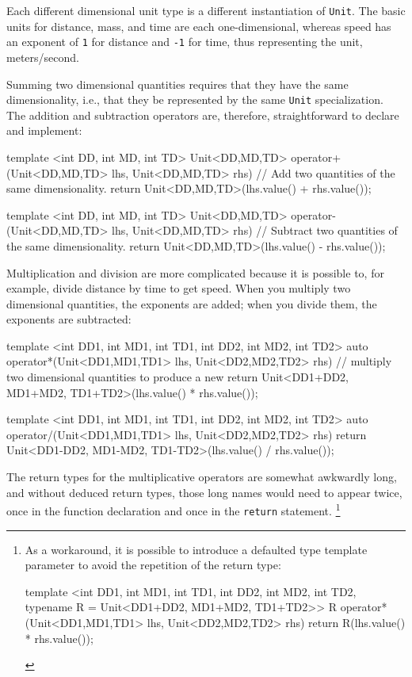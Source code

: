 \noindent Each different dimensional unit type is a different instantiation of
\lstinline!Unit!. The basic units for distance, mass, and time are each
one-dimensional, whereas speed has an exponent of \lstinline!1! for
distance and \lstinline!-1! for time, thus representing the unit,
meters/second.

Summing two dimensional quantities requires that they have the same
dimensionality, i.e., that they be represented by the same \lstinline!Unit!
specialization. The addition and subtraction operators are, therefore,
straightforward to declare and implement:

\begin{emcppslisting}[emcppsbatch=e5]
template <int DD, int MD, int TD>
Unit<DD,MD,TD> operator+(Unit<DD,MD,TD> lhs, Unit<DD,MD,TD> rhs)
    // Add two quantities of the same dimensionality.
{
    return Unit<DD,MD,TD>(lhs.value() + rhs.value());
}

template <int DD, int MD, int TD>
Unit<DD,MD,TD> operator-(Unit<DD,MD,TD> lhs, Unit<DD,MD,TD> rhs)
    // Subtract two quantities of the same dimensionality.
{
    return Unit<DD,MD,TD>(lhs.value() - rhs.value());
}
\end{emcppslisting}
    

\noindent Multiplication and division are more complicated because it is possible
to, for example, divide distance by time to get speed. When you multiply
two dimensional quantities, the exponents are added; when you divide
them, the exponents are subtracted:

\begin{emcppslisting}[emcppsbatch=e5]
template <int DD1, int MD1, int TD1, int DD2, int MD2, int TD2>
auto operator*(Unit<DD1,MD1,TD1> lhs, Unit<DD2,MD2,TD2> rhs)
    // multiply two dimensional quantities to produce a new
{
    return Unit<DD1+DD2, MD1+MD2, TD1+TD2>(lhs.value() * rhs.value());
}

template <int DD1, int MD1, int TD1, int DD2, int MD2, int TD2>
auto operator/(Unit<DD1,MD1,TD1> lhs, Unit<DD2,MD2,TD2> rhs)
{
    return Unit<DD1-DD2, MD1-MD2, TD1-TD2>(lhs.value() / rhs.value());
}
\end{emcppslisting}
    

\noindent The return types for the multiplicative operators are somewhat awkwardly
long, and without deduced return types, those long names would need to
appear twice, once in the function declaration and once in the
\lstinline!return! statement. {\cprotect\footnote{As a workaround, it is
possible to introduce a defaulted type template parameter to avoid the
repetition of the return type:

\begin{emcppslisting}[style=footcode,emcppsbatch=e6]
template <int DD1, int MD1, int TD1, int DD2, int MD2, int TD2,
        typename R = Unit<DD1+DD2, MD1+MD2, TD1+TD2>>
R operator*(Unit<DD1,MD1,TD1> lhs, Unit<DD2,MD2,TD2> rhs)
{
    return R(lhs.value() * rhs.value());
}
\end{emcppslisting}
      }}

